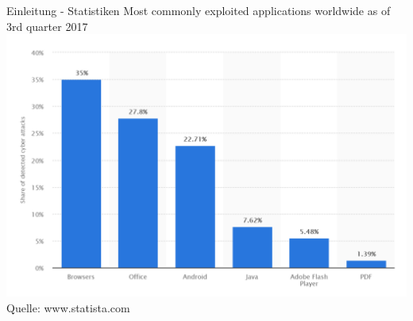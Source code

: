 \documentclass[10pt]{beamer}
\begin{document}
\begin{frame}[fragile]{Einleitung - Statistiken}
  Most commonly exploited applications worldwide as of 3rd quarter 2017
  \newline
  \includegraphics[scale=0.5]{cyberattacks_2017}
  \newline
  Quelle: www.statista.com
\end{frame}





\end{document}
